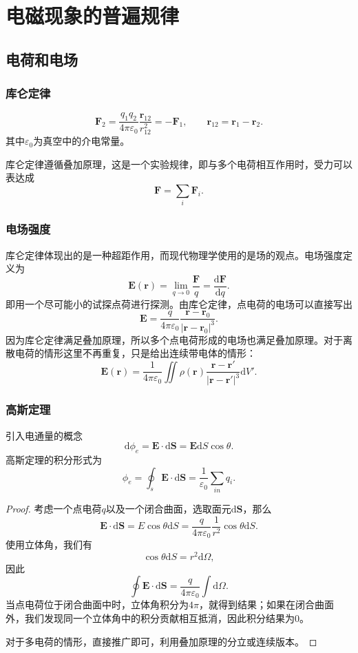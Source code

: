 \documentclass[UTF8]{ctexbook}
\renewcommand{\d}{\mathrm{d}}
\renewcommand{\b}{\boldsymbol}
\newtheorem{proof}{证明}
\numberwithin{equation}{chapter}
\begin{document}
	\chapter{电磁现象的普遍规律}
	\section{电荷和电场}
	\subsection{库仑定律}
	\[\b{F}_2=\frac{q_1q_2}{4\pi\varepsilon_0}\frac{\b{r}_{12}}{r_{12}^2}=-\b{F}_1,\qquad \b{r}_{12}=\b{r}_1-\b{r}_2.\]
	其中$\varepsilon_0$为真空中的介电常量。
	
	库仑定律遵循叠加原理，这是一个实验规律，即与多个电荷相互作用时，受力可以表达成
	\[\b{F}=\sum_{i}\b{F}_i.\]
	
	\subsection{电场强度}
	库仑定律体现出的是一种超距作用，而现代物理学使用的是场的观点。电场强度定义为
	\[\b{E}(\b{r})=\lim_{q\rightarrow 0}\frac{\b{F}}{q}=\frac{\d \b{F}}{\d q}.\]
	即用一个尽可能小的试探点荷进行探测。由库仑定律，点电荷的电场可以直接写出
	\[\b{E}=\frac{q}{4\pi\varepsilon_0}\frac{\b{r}-\b{r}_0}{|\b{r}-\b{r}_0|^3}.\]
	因为库仑定律满足叠加原理，所以多个点电荷形成的电场也满足叠加原理。对于离散电荷的情形这里不再重复，只是给出连续带电体的情形：
	\[\b{E}(\b{r})=\frac{1}{4\pi\varepsilon_0}\iint \rho(\b{r})\frac{\b{r}-\b{r}'}{|\b{r}-\b{r}'|^3}\d V'.\]
	
	\subsection{高斯定理}
	引入电通量的概念
	\[\d\phi_e=\b{E}\cdot\d\b{S}=\b{E}\d S\cos\theta.\]
	高斯定理的积分形式为
	\[\phi_e=\oint_s \b{E}\cdot\d\b{S}=\frac{1}{\varepsilon_0}\sum_{in}q_i.\]
	\begin{proof}
		考虑一个点电荷$q$以及一个闭合曲面，选取面元$\d\b{S}$，那么
		\[\b{E}\cdot\d\b{S}=E\cos\theta\d S=\frac{q}{4\pi\varepsilon_0}\frac{1}{r^2}\cos\theta\d S.\]
		使用立体角，我们有
		\[\cos\theta\d S=r^2\d\Omega,\]
		因此
		\[\oint\b{E}\cdot\d\b{S}=\frac{q}{4\pi\varepsilon_0}\int\d\Omega.\]
		当点电荷位于闭合曲面中时，立体角积分为$4\pi$，就得到结果；如果在闭合曲面外，我们发现同一个立体角中的积分贡献相互抵消，因此积分结果为0。
		
		对于多电荷的情形，直接推广即可，利用叠加原理的分立或连续版本。
	\end{proof}
\end{document}
